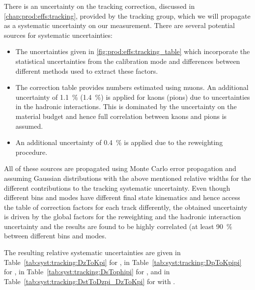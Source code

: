 There is an uncertainty on the tracking correction, discussed in 
\cref{chap:prod:effs:tracking}, provided by the tracking group, which we will 
propagate as a systematic uncertainty on our measurement.
There are several potential sources for systematic uncertainties:
\begin{itemize}
  \item The uncertainties given in \cref{fig:prod:effs:tracking_table} which incorporate the 
    statistical uncertainties from the calibration mode and differences between different methods
    used to extract these factors.
  \item The correction table provides numbers estimated using muons. An additional uncertainty
    of \SI{1.1}{\percent} (\SI{1.4}{\percent}) is applied for kaons (pions) due 
    to uncertainties in the hadronic interactions.
    This is dominated by the uncertainty on the material budget and hence full correlation
    between kaons and pions is assumed.
  \item An additional uncertainty of \SI{0.4}{\percent} is applied due to the 
    reweighting procedure.
\end{itemize}
All of these sources are propagated using Monte Carlo error propagation and assuming 
Gaussian distributions with the above mentioned relative widths for the different
contributions to the tracking systematic uncertainty.
Even though different bins and modes have different final state kinematics and hence access the table of correction
factors for each track differently, the obtained uncertainty is driven by the global factors for the reweighting and the hadronic
interaction uncertainty and the results are found to be highly correlated (at 
least \SI{90}{\percent} between different bins and modes.


The resulting relative systematic uncertainties are given in 
Table~\ref{tab:syst:tracking:DzToKpi} for \DzToKpi, in 
Table~\ref{tab:syst:tracking:DpToKpipi} for \DpToKpipi, in 
Table~\ref{tab:syst:tracking:DsTophipi} for \DspTophipi, and in 
Table~\ref{tab:syst:tracking:DstToDzpi_DzToKpi} for \DstToDzpi with \DzToKpi.


